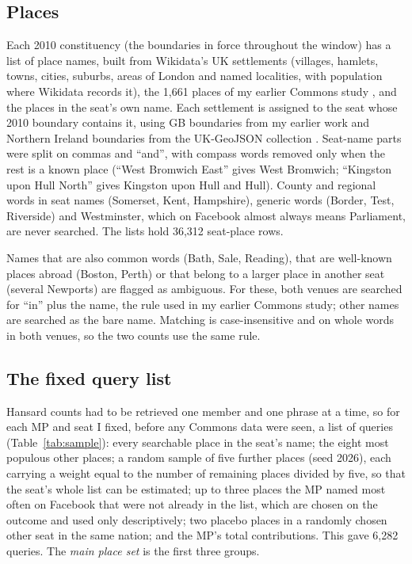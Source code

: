 \documentclass[11pt,a4paper]{article}
\begin{document}
\subsection{Places}
Each 2010 constituency (the boundaries in force throughout the window) has a list of place names, built from Wikidata's UK settlements \citep{wikidata2026} (villages, hamlets, towns, cities, suburbs, areas of London and named localities, with population where Wikidata records it), the 1,661 places of my earlier Commons study \citep{hotham2026a}, and the places in the seat's own name. Each settlement is assigned to the seat whose 2010 boundary contains it, using GB boundaries from my earlier work and Northern Ireland boundaries from the UK-GeoJSON collection \citep{ukgeojson}. Seat-name parts were split on commas and ``and'', with compass words removed only when the rest is a known place (``West Bromwich East'' gives West Bromwich; ``Kingston upon Hull North'' gives Kingston upon Hull and Hull). County and regional words in seat names (Somerset, Kent, Hampshire), generic words (Border, Test, Riverside) and Westminster, which on Facebook almost always means Parliament, are never searched. The lists hold 36,312 seat-place rows.

Names that are also common words (Bath, Sale, Reading), that are well-known places abroad (Boston, Perth) or that belong to a larger place in another seat (several Newports) are flagged as ambiguous. For these, both venues are searched for ``in'' plus the name, the rule used in my earlier Commons study; other names are searched as the bare name. Matching is case-insensitive and on whole words in both venues, so the two counts use the same rule.

\subsection{The fixed query list}
Hansard counts had to be retrieved one member and one phrase at a time, so for each MP and seat I fixed, before any Commons data were seen, a list of queries (Table~\ref{tab:sample}): every searchable place in the seat's name; the eight most populous other places; a random sample of five further places (seed 2026), each carrying a weight equal to the number of remaining places divided by five, so that the seat's whole list can be estimated; up to three places the MP named most often on Facebook that were not already in the list, which are chosen on the outcome and used only descriptively; two placebo places in a randomly chosen other seat in the same nation; and the MP's total contributions. This gave 6,282 queries. The \textit{main place set} is the first three groups.
\end{document}
